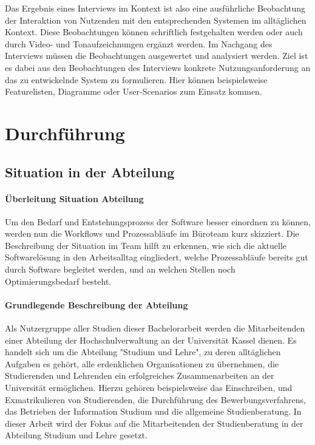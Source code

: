 \documentclass[12pt]{article}
\begin{document}
Das Ergebnis eines Interviews im Kontext ist also eine ausführliche Beobachtung
der Interaktion von Nutzenden mit den entsprechenden Systemen im alltäglichen
Kontext. Diese Beobachtungen können schriftlich festgehalten werden oder auch
durch Video- und Tonaufzeichnungen ergänzt werden. Im Nachgang des Interviews
müssen die Beobachtungen ausgewertet und analysiert werden. Ziel ist es dabei
aus den Beobachtungen des Interviews konkrete Nutzungsanforderung an das zu
entwickelnde System zu formulieren. Hier können beispielsweise Featurelisten,
Diagramme oder User-Scenarios zum Einsatz kommen.\cite{HMI-HCD}

\section{Durchführung}

\subsection{Situation in der Abteilung}

\paragraph{Überleitung Situation Abteilung}
Um den Bedarf und Entstehungsprozess der Software besser einordnen zu können,
werden nun die Workflows und Prozessabläufe im Büroteam kurz skizziert. Die
Beschreibung der Situation im Team hilft zu erkennen, wie sich die aktuelle
Softwarelösung in den Arbeitsalltag eingliedert, welche Prozessabläufe bereits
gut durch Software begleitet werden, und an welchen Stellen noch
Optimierungsbedarf besteht.

\paragraph{Grundlegende Beschreibung der Abteilung}
Als Nutzergruppe aller Studien dieser Bachelorarbeit werden die Mitarbeitenden
einer Abteilung der Hochschulverwaltung an der Universität Kassel dienen. Es
handelt sich um die Abteilung "Studium und Lehre", zu deren alltäglichen
Aufgaben es gehört, alle erdenklichen Organisationen zu übernehmen, die
Studierenden und Lehrenden ein erfolgreiches Zusammenarbeiten an der
Universität ermöglichen. Hierzu gehören beispielsweise das Einschreiben, und
Exmatrikulieren von Studierenden, die Durchführung des Bewerbungsverfahrens,
das Betrieben der Information Studium und die allgemeine Studienberatung. In
dieser Arbeit wird der Fokus auf die Mitarbeitenden der Studienberatung in der
Abteilung Studium und Lehre gesetzt.
\end{document}
